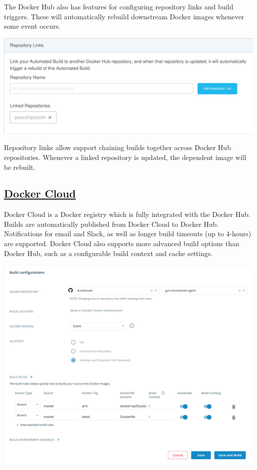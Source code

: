 The Docker Hub also has features for configuring repository links and build triggers. These will automatically rebuild downstream Docker images whenever some event occurs.\vspace{10pt}
%
\begin{centering}
\includegraphics[width=\textwidth]{../figures/docker_hub_repo_links.png}
\end{centering}
%
Repository links allow support chaining builds together across Docker Hub repositories. Whenever a linked repository is updated, the dependent image will be rebuilt.

\subsection{\href{https://cloud.docker.com/}{Docker Cloud}}

Docker Cloud is a Docker registry which is fully integrated with the Docker Hub. Builds are automatically published from Docker Cloud to Docker Hub. Notifications for email and Slack, as well as longer build timeouts (up to 4-hours) are supported. Docker Cloud also supports more advanced build options than Docker Hub, such as a configurable build context and cache settings.\\

\begin{centering}
\includegraphics[width=\textwidth]{../figures/docker_cloud.png}
\end{centering}
